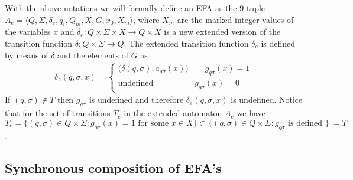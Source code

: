 \documentclass{article}
\begin{document}
With the above notations we will formally define an EFA as the
$9$-tuple $A_{e}=\langle Q, \Sigma, \delta_{e}, q_i, Q_m, X, G
,x_0, X_m \rangle$, where $X_m$ are the marked integer values of
the variables $x$ and $\delta_{e}: Q \times \Sigma \times X
\rightarrow Q\times X $ is a new extended version of the
transition function $\delta:Q \times \Sigma \rightarrow Q$. The
extended transition function $\delta_e$ is defined by means of
$\delta$ and the elements of $G$ as
\begin{eqnarray}
\delta_{e}(q,\sigma,x)=\left\{
\begin{array}{ll}
(\delta(q,\sigma),a_{q \sigma}(x)\big)\quad\quad g_{q \sigma}(x)=1\\
\textrm{undefined} \quad\quad\quad\quad\quad g_{q \sigma}(x)=0
\end{array}\right.
\end{eqnarray}
If $(q,\sigma)\notin T$ then $g_{q\sigma}$ is undefined and
therefore $\delta_{e}(q,\sigma,x)$ is undefined. Notice that for
the set of transitions $T_e$ in the extended automaton $A_e$ we
have $T_e=\{(q,\sigma)\in Q \times \Sigma: g_{q\sigma}(x)=1
\textrm{ for some } x\in X\}\subset \{(q,\sigma)\in Q \times
\Sigma: g_{q\sigma} \textrm{ is defined } \}\ =T$.



\subsection{Synchronous composition of EFA's}
\end{document}

